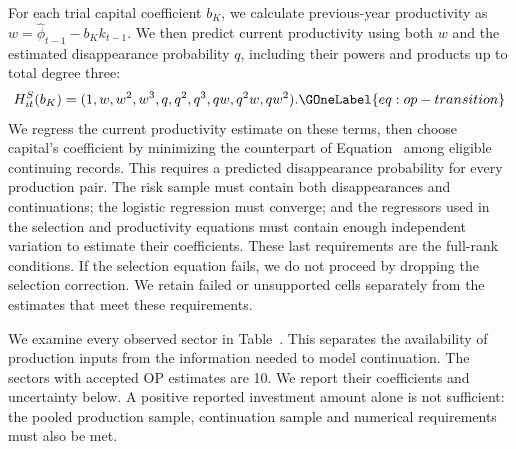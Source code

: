 For each trial capital coefficient $b_K$, we calculate previous-year productivity as $w=\widehat\phi_{t-1}-b_Kk_{t-1}$. We then predict current productivity using both $w$ and the estimated disappearance probability $q$, including their powers and products up to total degree three:
\begin{equation}
H^S_{it}(b_K)=(1,w,w^2,w^3,q,q^2,q^3,qw,q^2w,qw^2).
\GOneLabel{eq:op-transition}
\end{equation}
We regress the current productivity estimate on these terms, then choose capital's coefficient by minimizing the counterpart of Equation~ among eligible continuing records. This requires a predicted disappearance probability for every production pair. The risk sample must contain both disappearances and continuations; the logistic regression must converge; and the regressors used in the selection and productivity equations must contain enough independent variation to estimate their coefficients. These last requirements are the full-rank conditions. If the selection equation fails, we do not proceed by dropping the selection correction. We retain failed or unsupported cells separately from the estimates that meet these requirements.

We examine every observed sector in Table~. This separates the availability of production inputs from the information needed to model continuation.
The sectors with accepted OP estimates are 10. We report their coefficients and uncertainty below. A positive reported investment amount alone is not sufficient: the pooled production sample, continuation sample and numerical requirements must also be met.


